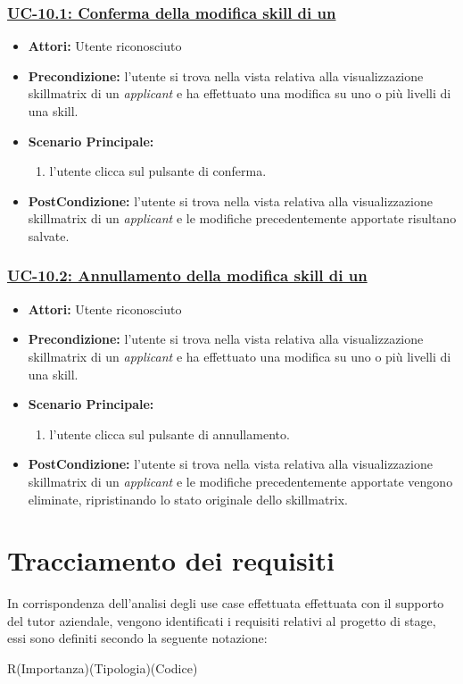 \subsubsection{\underline{UC-10.1: Conferma della modifica skill di un \applicant}}
\begin{itemize}
	\item \textbf{Attori:} Utente riconosciuto
	\item \textbf{Precondizione:} l'utente si trova nella vista relativa alla visualizzazione skillmatrix di un \textit{applicant} e ha effettuato una modifica su uno o più livelli di una skill.
	\item \textbf{Scenario Principale:}
	\begin{enumerate}
		\item l'utente clicca sul pulsante di conferma.
	\end{enumerate}
	\item \textbf{PostCondizione:} l'utente si trova nella vista relativa alla visualizzazione skillmatrix di un \textit{applicant} e le modifiche precedentemente apportate risultano salvate.
\end{itemize}

\subsubsection{\underline{UC-10.2: Annullamento della modifica skill di un\applicant}}
\begin{itemize}
	\item \textbf{Attori:} Utente riconosciuto
	\item \textbf{Precondizione:} l'utente si trova nella vista relativa alla visualizzazione skillmatrix di un \textit{applicant} e ha effettuato una modifica su uno o più livelli di una skill.
	\item \textbf{Scenario Principale:}
	\begin{enumerate}
		\item l'utente clicca sul pulsante di annullamento.
	\end{enumerate}
	\item \textbf{PostCondizione:} l'utente si trova nella vista relativa alla visualizzazione skillmatrix di un \textit{applicant} e le modifiche precedentemente apportate vengono eliminate, ripristinando lo stato originale dello skillmatrix.
\end{itemize}

\section{Tracciamento dei requisiti}
In corrispondenza dell'analisi degli use case effettuata effettuata con il supporto del tutor aziendale, vengono identificati i requisiti relativi al progetto di stage, essi sono definiti secondo la seguente notazione:
\vspace{1em}
\begin{center}
	R(Importanza)(Tipologia)(Codice)
\end{center}

